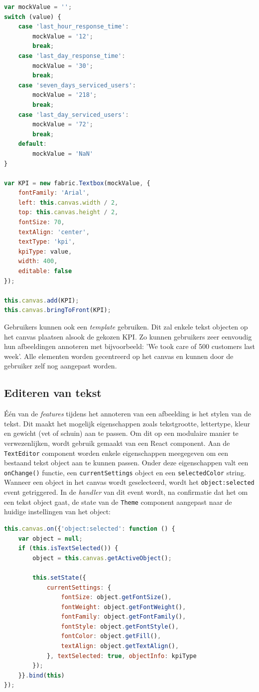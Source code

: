 \begin{lstlisting}[language=javascript]
var mockValue = '';
switch (value) {
	case 'last_hour_response_time':
		mockValue = '12';
		break;
	case 'last_day_response_time':
		mockValue = '30';
		break;
	case 'seven_days_serviced_users':
		mockValue = '218';
		break;
	case 'last_day_serviced_users':
		mockValue = '72';
		break;
	default:
		mockValue = 'NaN'
}

var KPI = new fabric.Textbox(mockValue, {
	fontFamily: 'Arial',
	left: this.canvas.width / 2,
	top: this.canvas.height / 2,
	fontSize: 70,
	textAlign: 'center',
	textType: 'kpi',
	kpiType: value,
	width: 400,
	editable: false
});

this.canvas.add(KPI);
this.canvas.bringToFront(KPI);
\end{lstlisting}

Gebruikers kunnen ook een \textit{template} gebruiken. Dit zal enkele tekst objecten op het canvas plaatsen alsook de gekozen KPI. Zo kunnen gebruikers zeer eenvoudig hun afbeeldingen annoteren met bijvoorbeeld: 'We took care of 500 customers last week'. Alle elementen worden gecentreerd op het canvas en kunnen door de gebruiker zelf nog aangepast worden. 

\subsection{Editeren van tekst}
\'{E}\'{e}n van de \textit{features} tijdens het annoteren van een afbeelding is het stylen van de tekst. Dit maakt het mogelijk eigenschappen zoals tekstgrootte, lettertype, kleur en gewicht (vet of schuin) aan te passen. Om dit op een modulaire manier te verwezenlijken, wordt gebruik gemaakt van een React component. Aan de \texttt{TextEditor} component worden enkele eigenschappen meegegeven om een bestaand tekst object aan te kunnen passen. Onder deze eigenschappen valt een \texttt{onChange()} functie, een \texttt{currentSettings} object en een \texttt{selectedColor} string. Wanneer een object in het canvas wordt geselecteerd, wordt het  \texttt{object:selected} event getriggered. In de \textit{handler} van dit event wordt, na confirmatie dat het om een tekst object gaat, de state van de \texttt{Theme} component aangepast naar de huidige instellingen van het object: 

\begin{lstlisting}[language=javascript]
this.canvas.on({'object:selected': function () {
	var object = null;
	if (this.isTextSelected()) {
		object = this.canvas.getActiveObject();

		this.setState({
			currentSettings: {
				fontSize: object.getFontSize(),
				fontWeight: object.getFontWeight(),
				fontFamily: object.getFontFamily(),
				fontStyle: object.getFontStyle(),
				fontColor: object.getFill(),
				textAlign: object.getTextAlign(),
			}, textSelected: true, objectInfo: kpiType
		});
	}}.bind(this)
});
\end{lstlisting}

